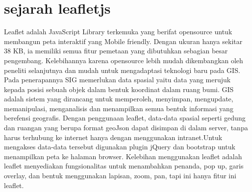  
 
 
 \section{sejarah leafletjs}
        Leaflet adalah JavaScript Library terkemuka yang berifat opensource untuk membangun peta interaktif yang Mobile friendly. Dengan ukuran hanya sekitar 38 KB, ia memiliki semua fitur pemetaan yang dibutuhkan sebagian besar pengembang.
    Kelebihannya karena opensource lebih mudah dikembangkan oleh peneliti selanjutnya dan mudah untuk mengadaptasi teknologi baru pada GIS. Pada penerapannya SIG memerlukan data spasial yaitu data yang merujuk kepada posisi sebuah objek dalam bentuk koordinat dalam ruang bumi. GIS adalah sistem yang dirancang untuk memperoleh, menyimpan, mengupdate, memanipulasi, menganalisis dan menampilkan semua bentuk informasi yang berefensi geografis.
Dengan penggunaan leaflet, data-data spasial seperti gedung dan ruangan yang berupa format geoJson dapat disimpan di dalam server, tanpa harus terhubung ke internet hanya dengan menggunakan intranet.Untuk mengakses data-data tersebut digunakan plugin jQuery dan bootstrap untuk menampilkan peta ke halaman browser. Kelebihan menggunakan leaflet adalah leaflet menyediakan fungsionalitas untuk menambahkan penanda, pop up, garis overlay, dan bentuk menggunakan lapisan, zoom, pan, tapi ini hanya fitur ini leaflet.

